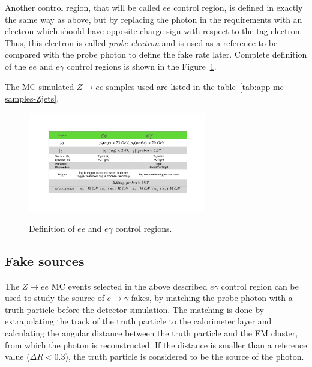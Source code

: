 Another control region, that will be called $ee$ control region, is defined in exactly the same way as above, but by replacing the photon in the requirements with an electron which should have opposite charge sign with respect to the tag electron.
Thus, this electron is called \textit{probe electron} and is used as a reference to be compared with the probe photon to define the fake rate later. Complete definition of the $ee$ and $e\gamma$ control regions is shown in the Figure~\ref{fig:egammafake_cr}.

The MC simulated $Z\rightarrow e e$ samples used are listed in the table~\ref{tab:app-mc-samples-Zjets}.

\begin{figure}[!htbp]
\centering
{\includegraphics[width=0.69\textwidth]{figures/egammafakes/efakeCR.pdf}}
\caption [] {Definition of $ee$ and $e\gamma$ control regions.}
\label{fig:egammafake_cr}
\end{figure} 


\FloatBarrier
\subsection{Fake sources}
\label{sec:egammafakes_source}

The $Z\to ee$ MC events selected in the above described $e\gamma$ control region can be used to study the source of $e\to\gamma$ fakes, by matching the probe photon with a truth particle before the detector simulation.
The matching is done by extrapolating the track of the truth particle to the calorimeter layer and calculating the angular distance between the truth particle and the EM cluster, from which the photon is reconstructed.
If the distance is smaller than a reference value ($\Delta R < 0.3$), the truth particle is considered to be the source of the photon.

